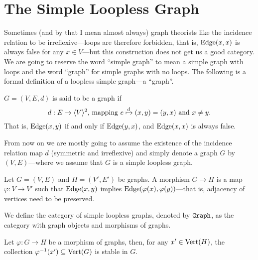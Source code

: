 \section{The Simple Loopless Graph}

Sometimes (and by that I mean almost always) graph theorists like the incidence
relation to be irreflexive---loops are therefore forbidden, that is,
\(\operatorname{Edge}(x, x)\) is always false for any \(x \in V\)---but this construction does
not get us a good category. We are going to reserve the word ``simple graph'' to
mean a simple graph with loops and the word ``graph'' for simple graphs with no
loops. The following is a formal definition of a loopless simple graph---a
``graph''.

\begin{definition}[Graph]\label{def: graph}
    \(G = (V, E, d)\) is said to be a graph if
    \[
        d: E \to \langle V \rangle^2 \text{, mapping } e \xmapsto d (x, y) = (y, x)
        \text{ and } x \neq y.
    \]
    That is, \(\operatorname{Edge}(x, y)\) if and only if \(\operatorname{Edge}(y, x)\), and \(\operatorname{Edge}(x, x)\) is
    always false.
\end{definition}

From now on we are mostly going to assume the existence of the incidence
relation map \(d\) (symmetric and irreflexive) and simply denote a graph \(G\)
by \((V, E)\)---where we assume that \(G\) is a simple loopless graph.

\begin{definition}\label{def: graph-morph}
    Let \(G = (V, E)\) and \(H = (V', E')\) be graphs. A morphism \(G \to H\) is a
    map \(\varphi: V \to V'\) such that \(\operatorname{Edge}(x, y)\) implies
    \(\operatorname{Edge}(\varphi(x), \varphi(y))\)---that is, adjacency of vertices need to be
    preserved.
\end{definition}

\begin{definition}\label{def: graph-cat}
    We define the category of simple loopless graphs, denoted by \({\texttt{Graph}}\), as
    the category with graph objects and morphisms of graphs.
\end{definition}

\begin{lemma}\label{lem: stable-preimage}
    Let \(\varphi: G \to H\) be a morphism of graphs, then, for any \(x' \in
    \operatorname{Vert}(H)\), the collection \(\varphi^{-1}(x') \subseteq \operatorname{Vert}(G)\) is stable in \(G\).
\end{lemma}

